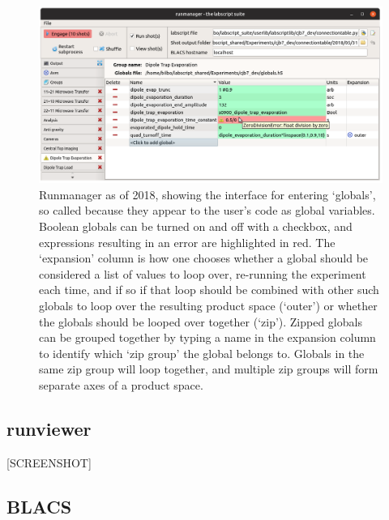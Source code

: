 \begin{figure}
\begin{center}
\includegraphics[width=\textwidth]{figures/software/new_screenshots/runmanager.png}
\caption{Runmanager as of 2018, showing the interface for entering `globals', so called because they appear to the user's code as global variables. Boolean globals can be turned on and off with a checkbox, and expressions resulting in an error are highlighted in red. The `expansion' column is how one chooses whether a global should be considered a list of values to loop over, re-running the experiment each time, and if so if that loop should be combined with other such globals to loop over the resulting product space (`outer') or whether the globals should be looped over together (`zip'). Zipped globals can be grouped together by typing a name in the expansion column to identify which `zip group' the global belongs to. Globals in the same zip group will loop together, and multiple zip groups will form separate axes of a product space.}\label{fig:runmanager}
\end{center}
\end{figure}

\subsection{runviewer}
[SCREENSHOT]

\subsection{BLACS}

